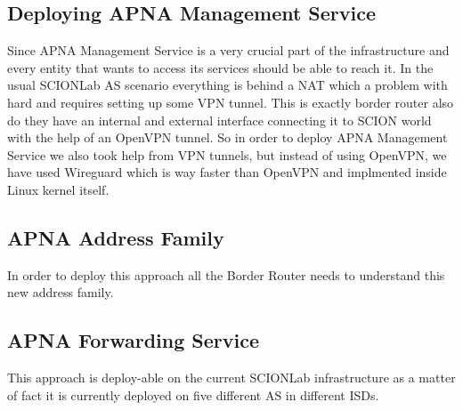 \subsection{Deploying APNA Management Service}
Since APNA Management Service is a very crucial part of the infrastructure and every entity that wants to access its services should be able to reach it. In the usual SCIONLab AS scenario everything is behind a NAT which a problem with hard and requires setting up some VPN tunnel. This is exactly border router also do they have an internal and external interface connecting it to SCION world with the help of an OpenVPN tunnel. So in order to deploy APNA Management Service we also took help from VPN tunnels, but instead of using OpenVPN, we have used Wireguard which is way faster than OpenVPN and implmented inside Linux kernel itself.

\subsection{APNA Address Family}
In order to deploy this approach all the Border Router needs to understand this new address family.

\subsection{APNA Forwarding Service}
This approach is deploy-able on the current SCIONLab infrastructure as a matter of fact it is currently deployed on five different AS in different ISDs.
